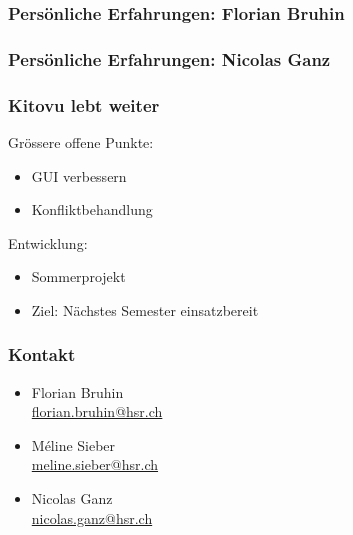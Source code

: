 \documentclass{beamer}
\begin{document}
	\begin{frame}
	   	\frametitle{Persönliche Erfahrungen: Florian Bruhin}
	\end{frame}
	\begin{frame}
	    	\frametitle{Persönliche Erfahrungen: Nicolas Ganz}
	\end{frame}
	
	
	\begin{frame}
	\frametitle{Kitovu lebt weiter}
	
	Grössere offene Punkte:
	\begin{itemize}
	  \item GUI verbessern
	  \item Konfliktbehandlung
	\end{itemize}
	
	Entwicklung:
	\begin{itemize}
	  \item Sommerprojekt
	  \item Ziel: Nächstes Semester einsatzbereit
	\end{itemize}
	\end{frame}
	
	\begin{frame}
	\frametitle{Kontakt}
	\begin{itemize}
	  \item Florian Bruhin \\ \url{florian.bruhin@hsr.ch} \\[2em]
	  \item Méline Sieber \\ \url{meline.sieber@hsr.ch} \\[2em]
	  \item Nicolas Ganz \\ \url{nicolas.ganz@hsr.ch}
	\end{itemize}
	\end{frame}
\end{document}
